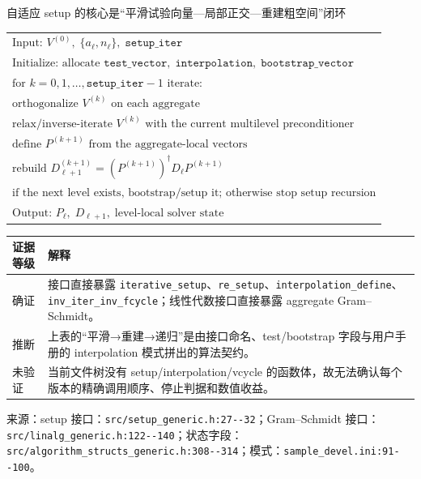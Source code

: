 \documentclass[UTF8,aspectratio=169,11pt]{ctexbeamer}
\newcommand{\source}[1]{%
  \vspace{0.06em}\par{\raggedright\scriptsize\color{muted}来源：#1\par}}
\newcommand{\verified}{\textcolor{evidence}{确证}}
\newcommand{\inferred}{\textcolor{accent}{推断}}
\newcommand{\unverified}{\textcolor{warning}{未验证}}
\newcommand{\code}[1]{\nolinkurl{#1}}
\newcommand{\denseframe}{%
  \footnotesize
  \setlength{\tabcolsep}{2.5pt}%
  \renewcommand{\arraystretch}{0.76}%
}
\begin{document}
\begin{frame}[t]{自适应 setup 的核心是“平滑试验向量—局部正交—重建粗空间”闭环}
  \denseframe
  \begin{center}
  \small
  \begin{tabular}{@{}l@{}}
    $\text{Input: }V^{(0)},\;\{a_\ell,n_\ell\},\;\texttt{setup\_iter}$ \\
    $\text{Initialize: }\text{allocate }\texttt{test\_vector},\;\texttt{interpolation},\;\texttt{bootstrap\_vector}$ \\
    $\text{for }k=0,1,\ldots,\texttt{setup\_iter}-1\text{ iterate:}$ \\
    \quad $\text{orthogonalize }V^{(k)}\text{ on each aggregate}$ \\
    \quad $\text{relax/inverse-iterate }V^{(k)}\text{ with the current multilevel preconditioner}$ \\
    \quad $\text{define }P^{(k+1)}\text{ from the aggregate-local vectors}$ \\
    \quad $\text{rebuild }D_{\ell+1}^{(k+1)}=(P^{(k+1)})^\dagger D_\ell P^{(k+1)}$ \\
    \quad $\text{if the next level exists, bootstrap/setup it; otherwise stop setup recursion}$ \\
    $\text{Output: }P_\ell,\;D_{\ell+1},\;\text{level-local solver state}$
  \end{tabular}
  \end{center}
  \vspace{0cm}
  \begin{tabularx}{0.96\textwidth}{@{}p{}Y@{}}
    \toprule
    证据等级 & 解释 \\
    \midrule
    \verified & 接口直接暴露 \code{iterative_setup}、\code{re_setup}、\code{interpolation_define}、\code{inv_iter_inv_fcycle}；线性代数接口直接暴露 aggregate Gram--Schmidt。 \\
    \inferred & 上表的“平滑→重建→递归”是由接口命名、test/bootstrap 字段与用户手册的 interpolation 模式拼出的算法契约。 \\
    \unverified & 当前文件树没有 setup/interpolation/vcycle 的函数体，故无法确认每个版本的精确调用顺序、停止判据和数值收益。 \\
    \bottomrule
  \end{tabularx}
  \source{setup 接口：\code{src/setup_generic.h:27--32}；Gram--Schmidt 接口：\code{src/linalg_generic.h:122--140}；状态字段：\code{src/algorithm_structs_generic.h:308--314}；模式：\code{sample_devel.ini:91--100}。}
\end{frame}
\end{document}
